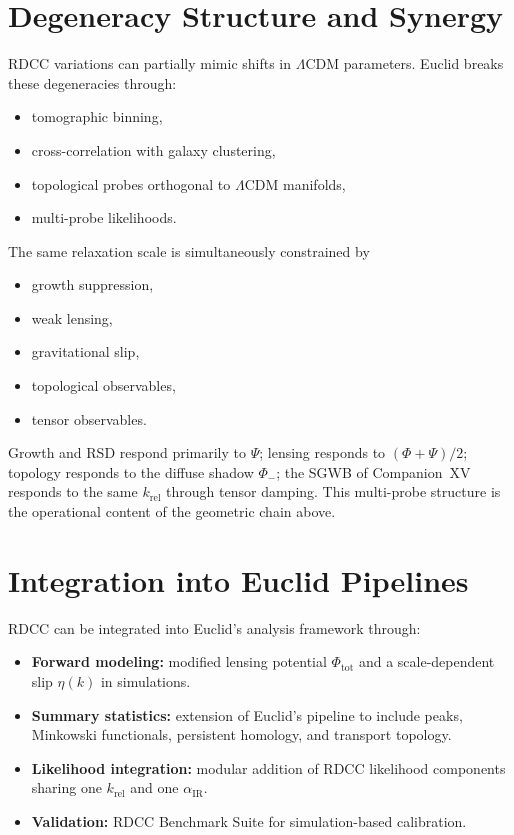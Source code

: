 \documentclass[11pt,a4paper]{article}
\begin{document}
\section{Degeneracy Structure and Synergy}

RDCC variations can partially mimic shifts in \(\Lambda\)CDM parameters.
Euclid breaks these degeneracies through:
\begin{itemize}
  \item tomographic binning,
  \item cross-correlation with galaxy clustering,
  \item topological probes orthogonal to \(\Lambda\)CDM manifolds,
  \item multi-probe likelihoods.
\end{itemize}

The same relaxation scale is simultaneously constrained by
\begin{itemize}
  \item growth suppression,
  \item weak lensing,
  \item gravitational slip,
  \item topological observables,
  \item tensor observables.
\end{itemize}
Growth and RSD respond primarily to \(\Psi\); lensing responds to
\((\Phi+\Psi)/2\); topology responds to the diffuse shadow \(\Phi_{-}\);
the SGWB of Companion~XV responds to the same \(k_{\mathrm{rel}}\) through
tensor damping. This multi-probe structure is the operational content of the
geometric chain above.


\section{Integration into Euclid Pipelines}

RDCC can be integrated into Euclid's analysis framework through:
\begin{itemize}
  \item \textbf{Forward modeling:}
        modified lensing potential \(\Phi_{\mathrm{tot}}\) and a
        scale-dependent slip \(\eta(k)\) in simulations.
  \item \textbf{Summary statistics:}
        extension of Euclid's pipeline to include peaks, Minkowski
        functionals, persistent homology, and transport topology.
  \item \textbf{Likelihood integration:}
        modular addition of RDCC likelihood components sharing one
        \(k_{\mathrm{rel}}\) and one \(\alpha_{\mathrm{IR}}\).
  \item \textbf{Validation:}
        RDCC Benchmark Suite for simulation-based calibration.
\end{itemize}
\end{document}
